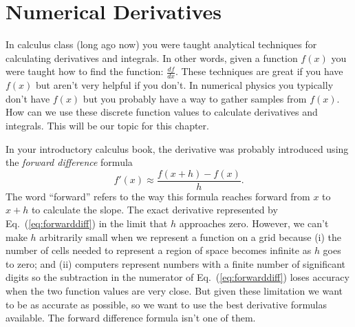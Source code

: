 \chapter[Numerical Derivatives]{Numerical Derivatives}
\label{ch:numderivs}

In calculus class (long ago now) you were taught analytical techniques
for calculating derivatives and integrals.  In other words, given a
function $f(x)$ you were taught how to find the function:
$\frac{df}{dx}$.  These techniques are great if you have $f(x)$ but
aren't very helpful if you don't.  In numerical physics you typically
don't have $f(x)$ but you probably have a way to gather samples from
$f(x)$.  How can we use these discrete function values to calculate
derivatives and integrals. This will be our topic for this chapter.

   

In your introductory
calculus book, the derivative was probably introduced using the {\it
  forward difference} formula
\begin{equation}\label{eq:forwarddiff}
     f'(x) \approx \frac{f(x+h)-f(x)}{h} .
\end{equation}
The word ``forward'' refers to the way this formula reaches forward
from $x$ to $x+h$ to calculate the slope. The exact derivative
represented by Eq.~(\ref{eq:forwarddiff}) in the limit that $h$
approaches zero.  However, we can't make $h$ arbitrarily small when
we represent a function on a grid because (i) the number of cells
needed to represent a region of space becomes infinite as $h$ goes to
zero; and (ii) computers represent numbers with a finite number of
significant digits so the subtraction in the numerator of
Eq.~(\ref{eq:forwarddiff}) loses accuracy when the two function
values are very close. But given these limitation we want to be as
accurate as possible, so we want to use the best derivative formulas
available. The forward difference formula isn't one of them.


